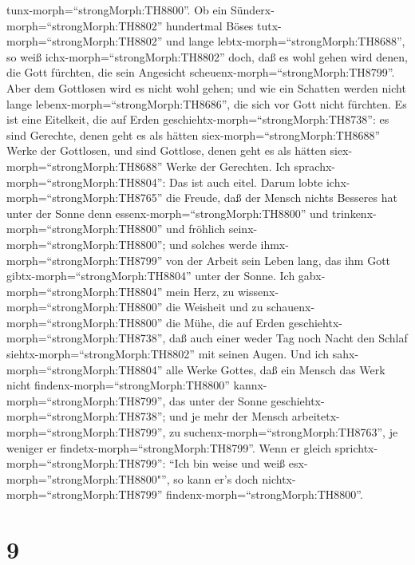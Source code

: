 tunx-morph=``strongMorph:TH8800''.  Ob ein
Sünderx-morph=``strongMorph:TH8802'' hundertmal Böses
tutx-morph=``strongMorph:TH8802'' und lange
lebtx-morph=``strongMorph:TH8688'', so weiß
ichx-morph=``strongMorph:TH8802'' doch, daß es wohl gehen wird denen,
die Gott fürchten, die sein Angesicht
scheuenx-morph=``strongMorph:TH8799''.  Aber dem Gottlosen
wird es nicht wohl gehen; und wie ein Schatten werden nicht lange
lebenx-morph=``strongMorph:TH8686'', die sich vor Gott nicht fürchten.
 Es ist eine Eitelkeit, die auf Erden
geschiehtx-morph=``strongMorph:TH8738'': es sind Gerechte, denen geht es
als hätten siex-morph=``strongMorph:TH8688'' Werke der Gottlosen, und
sind Gottlose, denen geht es als hätten
siex-morph=``strongMorph:TH8688'' Werke der Gerechten. Ich
sprachx-morph=``strongMorph:TH8804'': Das ist auch eitel. 
Darum lobte ichx-morph=``strongMorph:TH8765'' die Freude, daß der Mensch
nichts Besseres hat unter der Sonne denn
essenx-morph=``strongMorph:TH8800'' und
trinkenx-morph=``strongMorph:TH8800'' und fröhlich
seinx-morph=``strongMorph:TH8800''; und solches werde
ihmx-morph=``strongMorph:TH8799'' von der Arbeit sein Leben lang, das
ihm Gott gibtx-morph=``strongMorph:TH8804'' unter der Sonne.
 Ich gabx-morph=``strongMorph:TH8804'' mein Herz, zu
wissenx-morph=``strongMorph:TH8800'' die Weisheit und zu
schauenx-morph=``strongMorph:TH8800'' die Mühe, die auf Erden
geschiehtx-morph=``strongMorph:TH8738'', daß auch einer weder Tag noch
Nacht den Schlaf siehtx-morph=``strongMorph:TH8802'' mit seinen Augen.
 Und ich sahx-morph=``strongMorph:TH8804'' alle Werke
Gottes, daß ein Mensch das Werk nicht
findenx-morph=``strongMorph:TH8800'' kannx-morph=``strongMorph:TH8799'',
das unter der Sonne geschiehtx-morph=``strongMorph:TH8738''; und je mehr
der Mensch arbeitetx-morph=``strongMorph:TH8799'', zu
suchenx-morph=``strongMorph:TH8763'', je weniger er
findetx-morph=``strongMorph:TH8799''. Wenn er gleich
sprichtx-morph=``strongMorph:TH8799'': ``Ich bin weise und weiß
esx-morph=''strongMorph:TH8800"'', so kann er's doch
nichtx-morph=``strongMorph:TH8799''
findenx-morph=``strongMorph:TH8800''.

\hypertarget{section-8}{%
\section{9}\label{section-8}}


